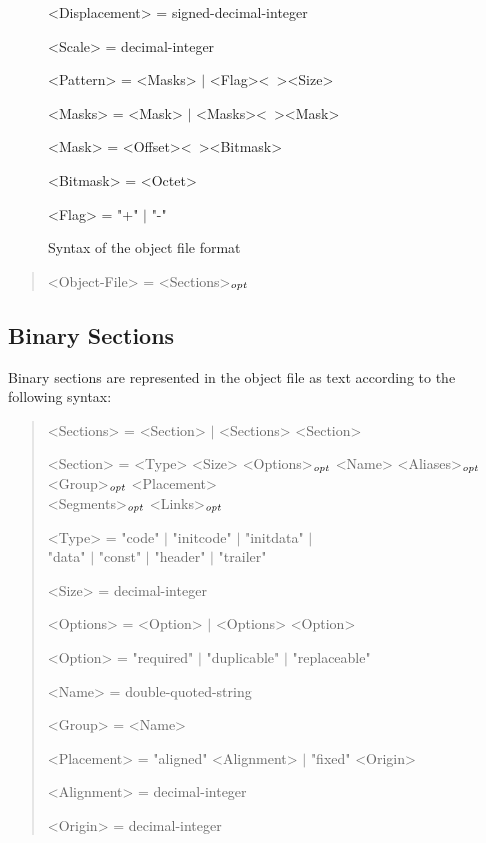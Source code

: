 \begin{figure}
\begin{minipage}{32em}
\begin{grammar}
<Displacement> = signed-decimal-integer \par
<Scale> = decimal-integer \par
<Pattern> = <Masks> $\mid$ <Flag><\ ><Size> \par
<Masks> = <Mask> $\mid$ <Masks><\ ><Mask> \par
<Mask> = <Offset><\ ><Bitmask> \par
<Bitmask> = <Octet> \par
<Flag> = "+" $\mid$ "-" \par
\end{grammar}\end{minipage}
\caption{Syntax of the object file format}
\label{fig:objfileformat}
\end{figure}

\begin{quote}\begin{grammar}
<Object-File> = <Sections>$_\mathit{opt}$ \par
\end{grammar}\end{quote}

\subsection{Binary Sections}

Binary sections are represented in the object file as text according to the following syntax:

\begin{quote}\begin{grammar}
<Sections> = <Section> $\mid$ <Sections> <Section> \par
<Section> = <Type> <Size> <Options>$_\mathit{opt}$ <Name> <Aliases>$_\mathit{opt}$ <Group>$_\mathit{opt}$ <Placement> \\ <Segments>$_\mathit{opt}$ <Links>$_\mathit{opt}$ \par
<Type> = "code" $\mid$ "initcode" $\mid$ "initdata" $\mid$ \ifbook\\\fi "data" $\mid$ "const" $\mid$ "header" $\mid$ "trailer" \par
<Size> = decimal-integer \par
<Options> = <Option> $\mid$ <Options> <Option> \par
<Option> = "required" $\mid$ "duplicable" $\mid$ "replaceable" \par
<Name> = double-quoted-string \par
<Group> = <Name> \par
<Placement> = "aligned" <Alignment> $\mid$ "fixed" <Origin> \par
<Alignment> = decimal-integer \par
<Origin> = decimal-integer \par
\end{grammar}\end{quote}

